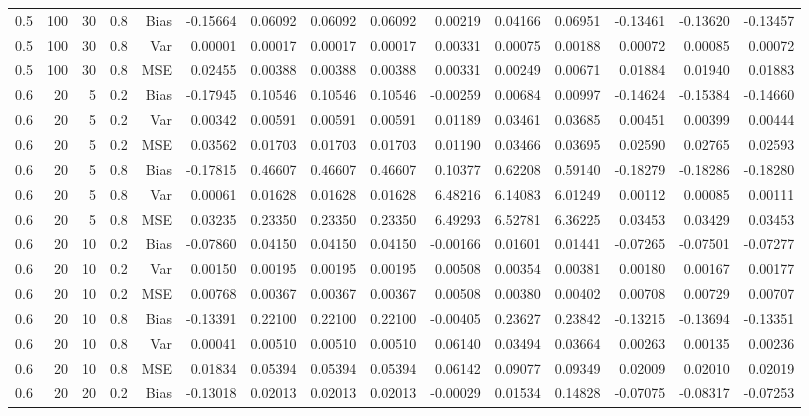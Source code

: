 \begin{table}[!htbp]
\begin{tabular}{lrrrrrrrrrrrrrr}
0.5 & 100 & 30 & 0.8 & Bias & -0.15664 & 0.06092 & 0.06092 & 0.06092 & 0.00219 & 0.04166 & 0.06951 & -0.13461 & -0.13620 & -0.13457 \\
0.5 & 100 & 30 & 0.8 & Var & 0.00001 & 0.00017 & 0.00017 & 0.00017 & 0.00331 & 0.00075 & 0.00188 & 0.00072 & 0.00085 & 0.00072 \\
0.5 & 100 & 30 & 0.8 & MSE & 0.02455 & 0.00388 & 0.00388 & 0.00388 & 0.00331 & 0.00249 & 0.00671 & 0.01884 & 0.01940 & 0.01883 \\
0.6 &  20 &  5 & 0.2 & Bias & -0.17945 & 0.10546 & 0.10546 & 0.10546 & -0.00259 & 0.00684 & 0.00997 & -0.14624 & -0.15384 & -0.14660 \\
0.6 &  20 &  5 & 0.2 & Var & 0.00342 & 0.00591 & 0.00591 & 0.00591 & 0.01189 & 0.03461 & 0.03685 & 0.00451 & 0.00399 & 0.00444 \\
0.6 &  20 &  5 & 0.2 & MSE & 0.03562 & 0.01703 & 0.01703 & 0.01703 & 0.01190 & 0.03466 & 0.03695 & 0.02590 & 0.02765 & 0.02593 \\
0.6 &  20 &  5 & 0.8 & Bias & -0.17815 & 0.46607 & 0.46607 & 0.46607 & 0.10377 & 0.62208 & 0.59140 & -0.18279 & -0.18286 & -0.18280 \\
0.6 &  20 &  5 & 0.8 & Var & 0.00061 & 0.01628 & 0.01628 & 0.01628 & 6.48216 & 6.14083 & 6.01249 & 0.00112 & 0.00085 & 0.00111 \\
0.6 &  20 &  5 & 0.8 & MSE & 0.03235 & 0.23350 & 0.23350 & 0.23350 & 6.49293 & 6.52781 & 6.36225 & 0.03453 & 0.03429 & 0.03453 \\
0.6 &  20 & 10 & 0.2 & Bias & -0.07860 & 0.04150 & 0.04150 & 0.04150 & -0.00166 & 0.01601 & 0.01441 & -0.07265 & -0.07501 & -0.07277 \\
0.6 &  20 & 10 & 0.2 & Var & 0.00150 & 0.00195 & 0.00195 & 0.00195 & 0.00508 & 0.00354 & 0.00381 & 0.00180 & 0.00167 & 0.00177 \\
0.6 &  20 & 10 & 0.2 & MSE & 0.00768 & 0.00367 & 0.00367 & 0.00367 & 0.00508 & 0.00380 & 0.00402 & 0.00708 & 0.00729 & 0.00707 \\
0.6 &  20 & 10 & 0.8 & Bias & -0.13391 & 0.22100 & 0.22100 & 0.22100 & -0.00405 & 0.23627 & 0.23842 & -0.13215 & -0.13694 & -0.13351 \\
0.6 &  20 & 10 & 0.8 & Var & 0.00041 & 0.00510 & 0.00510 & 0.00510 & 0.06140 & 0.03494 & 0.03664 & 0.00263 & 0.00135 & 0.00236 \\
0.6 &  20 & 10 & 0.8 & MSE & 0.01834 & 0.05394 & 0.05394 & 0.05394 & 0.06142 & 0.09077 & 0.09349 & 0.02009 & 0.02010 & 0.02019 \\
0.6 &  20 & 20 & 0.2 & Bias & -0.13018 & 0.02013 & 0.02013 & 0.02013 & -0.00029 & 0.01534 & 0.14828 & -0.07075 & -0.08317 & -0.07253 \\

\end{tabular}
\end{table}
